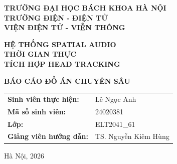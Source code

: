 \usepackage[toc,page]{appendix}

\usepackage[numbers,sort&compress]{natbib}
\usepackage{url}
\usepackage{hyperref}

\usepackage[vietnamese]{cleveref}



\begin{titlepage}
    \begin{center}
        \vspace*{1cm}
        \Large \textbf{TRƯỜNG ĐẠI HỌC BÁCH KHOA HÀ NỘI}\\
        \Large \textbf{TRƯỜNG ĐIỆN - ĐIỆN TỬ}\\
        \Large \textbf{VIỆN ĐIỆN TỬ - VIỄN THÔNG}

        \vspace{2.5cm}
        \Huge \textbf{HỆ THỐNG SPATIAL AUDIO\\ THỜI GIAN THỰC \\ TÍCH HỢP HEAD TRACKING}
        \vspace{1.5cm}

        \Large \textbf{BÁO CÁO ĐỒ ÁN CHUYÊN SÂU}
        \vfill

        \begin{table}[H]
            \centering
            \large
            \renewcommand{\arraystretch}{1.5}
            \begin{tabular}{ll}
                \textbf{Sinh viên thực hiện:} & Lê Ngọc Anh \\
                \textbf{Mã số sinh viên:} & 24020381 \\
                \textbf{Lớp:} & ELT2041\_61 \\
                \textbf{Giảng viên hướng dẫn:} & TS. Nguyễn Kiêm Hùng \\
            \end{tabular}
        \end{table}
        \vfill
        \Large Hà Nội, 2026
    \end{center}
\end{titlepage}

